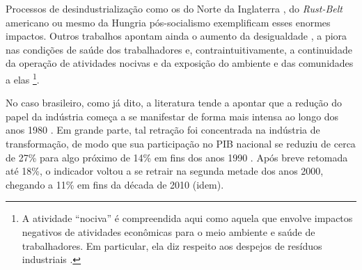 Processos de desindustrialização como os do Norte da Inglaterra
\citep{tomlinson_-industrialization_2016}, do
\emph{Rust-Belt} americano
\citep{high_industrial_2003} ou mesmo
da Hungria pós-socialismo
\citep{scheiring_left_2020}
exemplificam esses enormes impactos. Outros trabalhos apontam ainda o
aumento da desigualdade
\citep{kollmeyer_trade_2018}, a
piora nas condições de saúde dos trabalhadores
\citep{winant_hard_2019} e,
contraintuitivamente, a continuidade da operação de atividades nocivas e
da exposição do ambiente e das comunidades a elas
\citep{feltrin_noxious_2022}\footnote{A atividade ``nociva'' é compreendida aqui como aquela
  que envolve impactos negativos de atividades econômicas para o meio
  ambiente e saúde de trabalhadores. Em particular, ela diz respeito aos
  despejos de resíduos industriais
  \citep{feltrin_noxious_2022}.}.

No caso brasileiro, como já dito, a literatura tende a apontar que a
redução do papel da indústria começa a se manifestar de forma mais
intensa ao longo dos anos 1980
\citep{oreiro_desindustrializacao_2010}. Em grande parte, tal retração foi concentrada na indústria de
transformação, de modo que sua participação no PIB nacional se reduziu
de cerca de 27\% para algo próximo de 14\% em fins dos anos 1990
\citep{morceiro2021}.
Após breve retomada até 18\%, o indicador voltou a se retrair na segunda
metade dos anos 2000, chegando a 11\% em fins da década de 2010 (idem).

